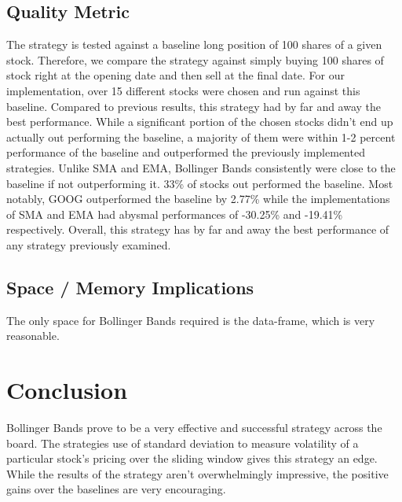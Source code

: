 \documentclass[letterpaper,11pt]{article}
\begin{document}
\subsection*{Quality Metric}
The strategy is tested against a baseline long position of 100 shares of a given stock. Therefore, we compare the strategy against simply buying 100 shares of stock right at the opening date and then sell at the final date. For our implementation, over 15 different stocks were chosen and run against this baseline. Compared to previous results, this strategy had by far and away the best performance. While a significant portion of the chosen stocks didn't end up actually out performing the baseline, a majority of them were within 1-2 percent performance of the baseline and outperformed the previously implemented strategies. Unlike SMA and EMA, Bollinger Bands consistently were close to the baseline if not outperforming it. 33\% of stocks  out performed the baseline. Most notably, GOOG outperformed the baseline by 2.77\% while the implementations of SMA and EMA had abysmal performances of -30.25\% and -19.41\% respectively. Overall, this strategy has by far and away the best performance of any strategy previously examined.

\subsection*{Space / Memory Implications}
The only space for Bollinger Bands required is the data-frame, which is very reasonable.

\section*{Conclusion}
Bollinger Bands prove to be a very effective and successful strategy across the board. The strategies use of standard deviation to measure volatility of a particular stock's pricing over the sliding window gives this strategy an edge. While the results of the strategy aren't overwhelmingly impressive, the positive gains over the baselines are very encouraging.
\end{document}
